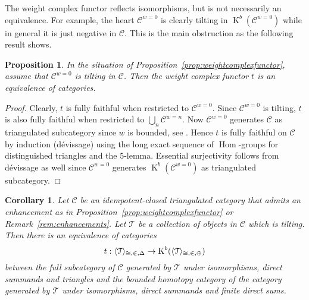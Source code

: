 \documentclass{amsart}
\theoremstyle{plain}
\newtheorem{proposition}[theorem]{Proposition}
\newtheorem{corollary}[theorem]{Corollary}
\theoremstyle{TheoremNum}
\theoremstyle{definition}
\theoremstyle{remark}
\numberwithin{equation}{section}
\newcommand{\Cc}{\mathcal{C}}
\newcommand{\Tt}{\mathcal{T}}
\newcommand{\Hom}{\operatorname{Hom}}
\newcommand{\K}{\operatorname{K}}
\begin{document}
The weight complex functor reflects isomorphisms, but is not necessarily an equivalence. For example, the heart $\Cc^{w=0}$ is clearly tilting in $\K^b(\Cc^{w=0})$ while in general it is just negative in $\Cc.$
This is the main obstruction as the following result shows.
\begin{proposition}\label{prop:weightcomplexfunctorequivalence}
In the situation of Proposition~\ref{prop:weightcomplexfunctor}, assume that $\Cc^{w=0}$ is tilting in $\Cc$. Then the weight complex functor $t$ is an equivalence of categories.
\end{proposition}
\begin{proof}
Clearly, $t$ is fully faithful when restricted to $\Cc^{w=0}.$
Since $\Cc^{w=0}$ is tilting, $t$ is also fully faithful when restricted to $\bigcup_n\Cc^{w=n}.$ Now $\Cc^{w=0}$ generates $\Cc$ as triangulated subcategory since $w$ is bounded, see \cite[Corollary 1.5.7]{bondarko_weight_2010}. Hence $t$ is fully faithful on $\Cc$ by induction (dévissage) using the long exact sequence of $\Hom$-groups for distinguished triangles and the $5$-lemma. Essential surjectivity follows from dévissage as well since $\Cc^{w=0}$ generates $\K^b(\Cc^{w=0})$ as triangulated subcategory.
\end{proof}
\begin{corollary}\label{cor:triangulatedcatequalshomotopycat}
Let $\Cc$ be an idempotent-closed triangulated category that admits an enhancement as in Proposition~\ref{prop:weightcomplexfunctor} or Remark~\ref{rem:enhancements}. Let $\Tt$ be a collection of objects in $\Cc$ which is tilting. Then there is an equivalence of categories
$$t:\langle \Tt \rangle_{\cong, \inplus, \Delta}\to\K^b(\langle \Tt \rangle_{\cong, \inplus, \oplus})$$
between the full subcategory of $\Cc$ generated by $\Tt$ under isomorphisms, direct summands and triangles and the bounded homotopy category of the category generated  by $\Tt$ under isomorphisms, direct summands and finite direct sums.
\end{corollary}
\end{document}

